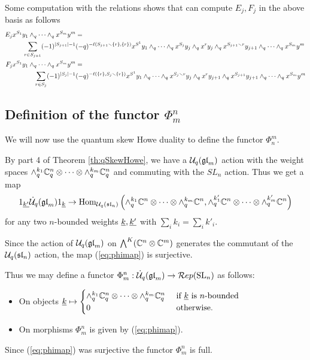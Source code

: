 \documentclass[11pt,leqno]{article}
\begin{document}
Some computation with the relations shows that can compute $ E_j, F_j $ in the above basis as follows
\begin{align} \label{eq:Eaction}
E_j x^{S_1} y_1 \wedge_q \cdots \wedge_q x^{S_m}y^m  &=\\
\sum_{r \in S_{j+1}} (-1)^{|S_{j+1}| - 1}& (-q)^{-\ell(S_{j+1}\smallsetminus \{r\}, \{r\})} x^{S^1} y_1 \wedge_q \cdots \wedge_q x^{S_j} y_j \wedge_q x^r y_j \wedge_q x^{S_{j+1} \smallsetminus r} y_{j+1} \wedge_q \cdots \wedge_q x^{S_m} y^m \notag\\
\label{eq:Faction}
F_j x^{S_1} y_1 \wedge_q \cdots \wedge_q x^{S_m}y^m  &=\\
 \sum_{r \in S_j} (-1)^{|S_j| -1} & (-q)^{-\ell(\{r\}, S_{j}\smallsetminus \{r\})} x^{S^1} y_1 \wedge_q \cdots \wedge_q x^{S_j \smallsetminus r} y_j \wedge_q x^r y_{j+1} \wedge_q x^{S_{j+1}} y_{j+1} \wedge_q \cdots \wedge_q x^{S_m} y^m \notag
\end{align}

\subsection{Definition of the functor $\Phi_m^n$}

We will now use the quantum skew Howe duality to define the functor $ \Phi_n^m$.

By part 4 of Theorem \ref{th:qSkewHowe}, we have a $\mathcal{U}_q({\mathfrak{gl}}_m)$ action with the weight spaces $\wedge^{k_1}_q \mathbb C_q^n \otimes \cdots \otimes \wedge^{k_m}_q \mathbb C_q^n$ and commuting with the $SL_n $ action.  Thus we get a map
\begin{equation}\label{eq:phimap}
1_{\underline{k'}} \dot{{\mathcal{U}}}_q({\mathfrak{gl}}_m) 1_{\underline{k}} \rightarrow \operatorname{Hom}_{\mathcal{U}_q({\mathfrak{sl}}_n)} \left(\wedge^{k_1}_q \mathbb C^n \otimes \cdots \otimes \wedge^{k_m}_q \mathbb C^n, \wedge^{k'_1}_q \mathbb C^n \otimes \cdots \otimes \wedge^{k'_m}_q \mathbb C^n\right)
\end{equation}
for any two $n$-bounded weights ${\underline{k}}, {\underline{k'}}$ with $\sum_i k_i = \sum_i k'_i $.

Since the action of $\mathcal{U}_q({\mathfrak{gl}}_m)$  on $\bigwedge^K(\mathbb C^n \otimes \mathbb C^m) $ generates the commutant of the $\mathcal{U}_q({\mathfrak{sl}}_n)$ action, the map (\ref{eq:phimap}) is surjective.

Thus we may define a functor $\Phi_m^n : \dot{{\mathcal{U}}}_q({\mathfrak{gl}}_m) \rightarrow \mathcal{R}ep({\rm{SL}}_n)$ as follows:
\begin{itemize}
\item On objects
${\underline{k}} \mapsto
\begin{cases}
\wedge^{k_1}_q \mathbb C_q^n \otimes \cdots \otimes \wedge^{k_m}_q \mathbb C_q^n & \text{ if } {\underline{k}} \text{ is } n\text{-bounded } \\
0 & \text{ otherwise.}
\end{cases}$
\item On morphisms $ \Phi_m^n $ is given by (\ref{eq:phimap}).
\end{itemize}
Since (\ref{eq:phimap}) was surjective the functor $\Phi_m^n$ is full.
\end{document}
